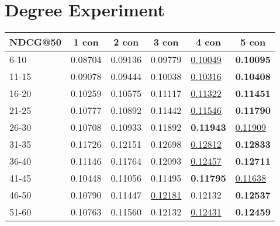 \section{Degree Experiment}
\begin{table*}[]
    \begin{tabular}{|l|l|l|l|l|l|}
        \hline
        NDCG@50 & \multicolumn{1}{c|}{1 con} & \multicolumn{1}{c|}{2 con} & \multicolumn{1}{c|}{3 con} & \multicolumn{1}{c|}{4 con} & \multicolumn{1}{c|}{5 con} \\ \hline
        6-10    & 0.08704                    & 0.09136                    & 0.09779                    & \underline{0.10049}        & \textbf{0.10095}           \\ \hline
        11-15   & 0.09078                    & 0.09444                    & 0.10038                    & \underline{0.10316}        & \textbf{0.10408}           \\ \hline
        16-20   & 0.10259                    & 0.10575                    & 0.11117                    & \underline{0.11322}        & \textbf{0.11451}           \\ \hline
        21-25   & 0.10777                    & 0.10892                    & 0.11442                    & \underline{0.11546}        & \textbf{0.11790}           \\ \hline
        26-30   & 0.10708                    & 0.10933                    & 0.11892                    & \textbf{0.11943}           & \underline{0.11909}        \\ \hline
        31-35   & 0.11726                    & 0.12151                    & 0.12698                    & \underline{0.12812}        & \textbf{0.12833}           \\ \hline
        36-40   & 0.11146                    & 0.11764                    & 0.12093                    & \underline{0.12457}        & \textbf{0.12711}           \\ \hline
        41-45   & 0.10448                    & 0.11056                    & 0.11495                    & \textbf{0.11795}           & \underline{0.11638}        \\ \hline
        46-50   & 0.10790                    & 0.11447                    & \underline{0.12181}        & 0.12132                    & \textbf{0.12537}           \\ \hline
        51-60   & 0.10763                    & 0.11560                    & 0.12132                    & \underline{0.12431}        & \textbf{0.12459}           \\ \hline

\end{tabular}
\end{table*}
